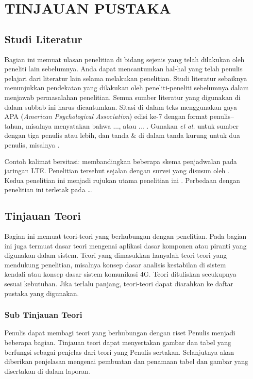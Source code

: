 \chapter{TINJAUAN PUSTAKA}

\section{Studi Literatur}
Bagian ini memuat ulasan penelitian di bidang sejenis yang telah dilakukan oleh peneliti lain sebelumnya. Anda dapat mencantumkan hal-hal yang telah penulis pelajari dari literatur lain selama melakukan penelitian. Studi literatur sebaiknya menunjukkan pendekatan yang dilakukan oleh peneliti-peneliti sebelumnya dalam menjawab permasalahan penelitian. Semua sumber literatur yang digunakan di dalam subbab ini harus dicantumkan. Sitasi di dalam teks menggunakan gaya APA (\textit{American Psychological Association}) edisi ke-7 dengan format penulis--tahun, misalnya \textcite{andrews2007} menyatakan bahwa ..., atau ... \parencite{capozzi2013}. Gunakan \textit{et al.} untuk sumber dengan tiga penulis atau lebih, dan tanda \& di dalam tanda kurung untuk dua penulis, misalnya \parencite{xu2012}.

Contoh kalimat bersitasi: \textcite{alqahtani2013} membandingkan beberapa skema penjadwalan pada jaringan LTE. Penelitian tersebut sejalan dengan survei yang disusun oleh \textcite{capozzi2013}. Kedua penelitian ini menjadi rujukan utama penelitian ini \parencite{alqahtani2013,capozzi2013}. Perbedaan dengan penelitian ini terletak pada …

\section{Tinjauan Teori}
Bagian ini memuat teori-teori yang berhubungan dengan penelitian. Pada bagian ini juga termuat dasar teori mengenai aplikasi dasar komponen atau piranti yang digunakan dalam sistem. Teori yang dimasukkan hanyalah teori-teori yang mendukung penelitian, misalnya konsep dasar analisis kestabilan di sistem kendali atau konsep dasar sistem komunikasi 4G. Teori dituliskan secukupnya sesuai kebutuhan. Jika terlalu panjang, teori-teori dapat diarahkan ke daftar pustaka yang digunakan.

\subsection{Sub Tinjauan Teori}
Penulis dapat membagi teori yang berhubungan dengan riset Penulis menjadi beberapa bagian. Tinjauan teori dapat menyertakan gambar dan tabel yang berfungsi sebagai penjelas dari teori yang Penulis sertakan. Selanjutnya akan diberikan penjelasan mengenai pembuatan dan penamaan tabel dan gambar yang disertakan di dalam laporan.

